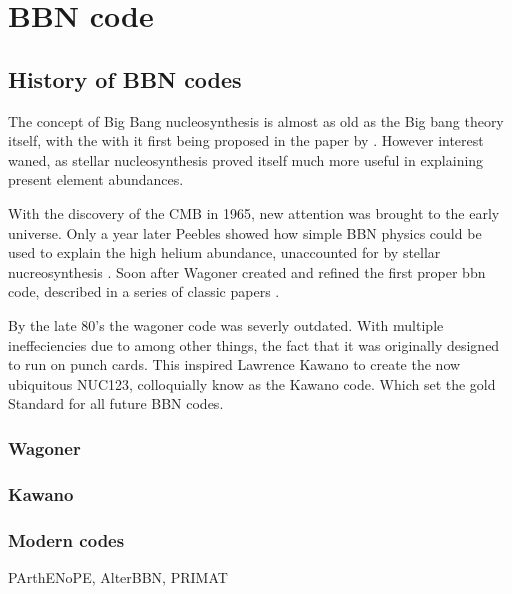 
\chapter{BBN code}
\label{chap:BBNcode}

\section{History of BBN codes}
\label{sec:BBN_history}

The concept of Big Bang nucleosynthesis is almost as old as the Big bang theory itself, with the with it first being proposed in the paper by \cite{Gamov48}. However interest waned, as stellar nucleosynthesis proved itself much more useful in explaining present element abundances. 

With the discovery of the CMB in 1965, new attention was brought to the early universe. Only a year later Peebles showed how simple BBN physics could be used to explain the high helium abundance, unaccounted for by stellar nucreosynthesis \cite{Peebles66}. Soon after Wagoner created and refined the first proper bbn code, described in a series of classic papers \cite{Wagoner67} \cite{Wagoner69} \cite{Wagoner72}.


By the late 80's the wagoner code was severly outdated. With multiple ineffeciencies due to among other things, the fact that it was originally designed to run on punch cards. This inspired Lawrence Kawano to create the now ubiquitous NUC123, colloquially know as the Kawano code. Which set the gold Standard for all future BBN codes. 



\subsection{Wagoner}
\label{sec:Wagoner}

\subsection{Kawano}
\label{sec:Kawano}

\subsection{Modern codes}
\label{sec:Modern_codes}
PArthENoPE, AlterBBN, PRIMAT


